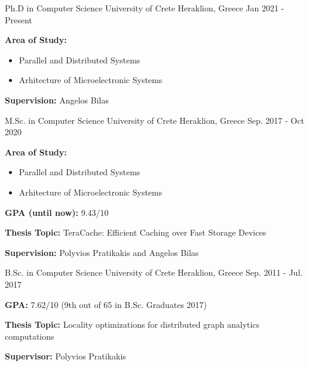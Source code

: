 
\begin{cventries}

  \cventry
    {Ph.D in Computer Science} %
    {University of Crete} %
    {Heraklion, Greece} %
    {Jan 2021 - Present} %
    {
      \begin{cvitems} %
      \item{\textbf{Area of Study:}}
          \begin{itemize}
          \item{Parallel and Distributed Systems}
          \item{Arhitecture of Microelectronic Systems}
          \end{itemize}
        \item{\textbf{Supervision:} Angelos Bilas}
      \end{cvitems}
    }
  \cventry
    {M.Sc. in Computer Science} %
    {University of Crete} %
    {Heraklion, Greece} %
    {Sep. 2017 - Oct 2020} %
    {
      \begin{cvitems} %
      \item{\textbf{Area of Study:}}
          \begin{itemize}
          \item{Parallel and Distributed Systems}
          \item{Arhitecture of Microelectronic Systems}
          \end{itemize}
      \item{\textbf{GPA (until now):} 9.43/10}
      \item{\textbf{Thesis Topic:} 
         TeraCache: Efficient Caching over Fast Storage Devices}
        \item{\textbf{Supervision:} Polyvios Pratikakis and Angelos Bilas}
      \end{cvitems}
    }

  \cventry
    {B.Sc. in Computer Science} %
    {University of Crete} %
    {Heraklion, Greece} %
    {Sep. 2011 - Jul. 2017} %
    {
      \begin{cvitems} %
      \item{\textbf{GPA:} 7.62/10 (9th out of 65 in B.Sc. Graduates 2017)}
      \item{\textbf{Thesis Topic:} Locality optimizations for
          distributed graph analytics computations}
        \item{\textbf{Supervisor:} Polyvios Pratikakis}
      \end{cvitems}
    }

\end{cventries}
